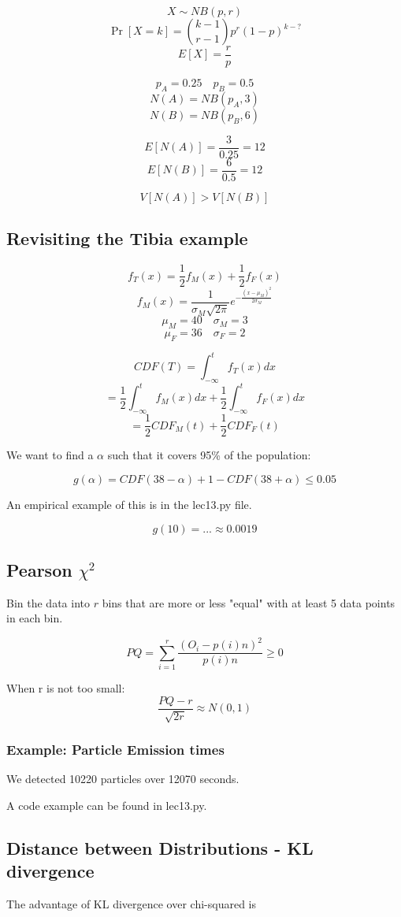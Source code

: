 \documentclass[a4paper]{article}
\begin{document}
\[X \sim NB(p, r)\]
\[\Pr[X=k]=\binom{k-1}{r-1} p^r (1-p)^{k-?}\]
\[E[X]=\frac{r}{p}\]

\[p_A=0.25 \quad p_B=0.5\]
\[N(A)=NB(p_A, 3)\]
\[N(B)=NB(p_B, 6)\]

\[E[N(A)] = \frac{3}{0.25} = 12\]
\[E[N(B)] = \frac{6}{0.5} = 12\]

\[V[N(A)] > V[N(B)]\]

\subsection{Revisiting the Tibia example}

\[f_T(x) = \frac{1}{2}f_M(x)+\frac{1}{2}f_F(x)\]
\[f_M(x) = \frac{1}{\sigma_M \sqrt{2\pi}} e^{-\frac{(x-\mu_M)^2}{2\sigma_M}}\]
\[\mu_M=40 \quad \sigma_M=3\]
\[\mu_F=36 \quad \sigma_F=2\]

\[CDF(T)=\int_{-\infty}^t f_T(x) dx\]
\[=\frac{1}{2} \int_{-\infty}^t f_M(x) dx + \frac{1}{2}\int_{-\infty}^t f_F(x)dx\]
\[=\frac{1}{2} CDF_M(t) + \frac{1}{2} CDF_F(t)\]

We want to find a $\alpha$ such that it covers 95\% of the population:

\[g(\alpha) = CDF(38-\alpha) + 1 - CDF(38 + \alpha) \le 0.05\]

An empirical example of this is in the lec13.py file.

\[g(10)=...\approx0.0019\]

\subsection{Pearson \texorpdfstring{$\chi^2$}{chi squared}}

Bin the data into $r$ bins that are more or less "equal" with at least 5 data points in each bin.

\[PQ=\sum_{i=1}^r \frac{(O_i - p(i)n)^2}{p(i)n}\ge 0\]

When r is not too small:
\[\frac{PQ-r}{\sqrt{2r}} \approx N(0,1)\]

\subsubsection{Example: Particle Emission times}

We detected 10220 particles over 12070 seconds.

A code example can be found in lec13.py.

\subsection{Distance between Distributions - KL divergence}
The advantage of KL divergence over chi-squared is 
\end{document}
